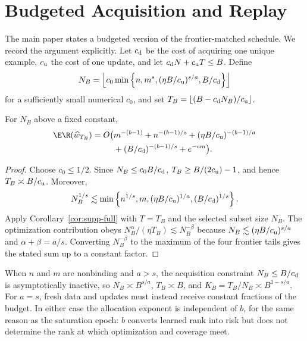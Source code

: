 \section{Budgeted Acquisition and Replay}

The main paper states a budgeted version of the frontier-matched schedule. We
record the argument explicitly. Let $c_{\rm d}$ be the cost of acquiring one
unique example, $c_{\rm u}$ the cost of one update, and let
$c_{\rm d}N+c_{\rm u}T\le B$. Define
\[
N_B=\left\lfloor c_0\min\left\{
 n,m^s,(\eta B/c_{\rm u})^{s/a},B/c_{\rm d}
\right\}\right\rfloor
\]
for a sufficiently small numerical $c_0$, and set
$T_B=\lfloor(B-c_{\rm d}N_B)/c_{\rm u}\rfloor$.

\begin{corollary}
For $N_B$ above a fixed constant,
\begin{align*}
\E\R(\widehat w_{T_B})=O\bigl(&m^{-(b-1)}+n^{-(b-1)/s}
 +(\eta B/c_{\rm u})^{-(b-1)/a}\\
&+(B/c_{\rm d})^{-(b-1)/s}+e^{-cm}\bigr).
\end{align*}
\end{corollary}

\begin{proof}
Choose $c_0\le1/2$. Since $N_B\le c_0B/c_{\rm d}$,
$T_B\ge B/(2c_{\rm u})-1$, and hence $T_B\asymp B/c_{\rm u}$. Moreover,
\[
N_B^{1/s}\lesssim
\min\left\{n^{1/s},m,(\eta B/c_{\rm u})^{1/a},
(B/c_{\rm d})^{1/s}\right\}.
\]
Apply Corollary~\ref{cor:supp-full} with $T=T_B$ and the selected subset size
$N_B$. The optimization contribution obeys
$N_B^\alpha/(\eta T_B)\lesssim N_B^{-\beta}$ because
$N_B\lesssim(\eta B/c_{\rm u})^{s/a}$ and
$\alpha+\beta=a/s$. Converting $N_B^{-\beta}$ to the maximum of the four
frontier tails gives the stated sum up to a constant factor.
\end{proof}

When $n$ and $m$ are nonbinding and $a>s$, the acquisition constraint
$N_B\le B/c_{\rm d}$ is asymptotically inactive, so
$N_B\asymp B^{s/a}$, $T_B\asymp B$, and
$K_B=T_B/N_B\asymp B^{1-s/a}$. For $a=s$, fresh data and updates must instead
receive constant fractions of the budget. In either case the allocation
exponent is independent of $b$, for the same reason as the saturation epoch:
$b$ converts learned rank into risk but does not determine the rank at which
optimization and coverage meet.
